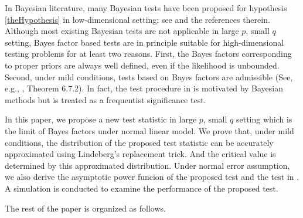 \documentclass[11pt]{article}
\theoremstyle{plain}
\theoremstyle{definition}
\theoremstyle{remark}
\begin{document}
In Bayesian literature, many Bayesian tests have been proposed for hypothesis \eqref{theHypothesis} in low-dimensional setting; see \cite{javier2006Obj,Goddard2016,zhou2018On} and the references therein.
Although most existing Bayesian tests are not applicable in large $p$, small $q$ setting,
Bayes factor based tests are in principle suitable for high-dimensional testing problems for at least two reasons.
First, the Bayes factors corresponding to proper priors are always well defined, even if the likelihood is unbounded.
Second, under mild conditions, tests based on Bayes factors are admissible (See, e.g., \cite{Lehmann}, Theorem 6.7.2).
In fact, the test procedure in \cite{Goeman2006} is motivated by Bayesian methods but is treated as a frequentist significance test.


In this paper, we propose a new test statistic in large $p$, small $q$ setting which is the limit of Bayes factors under normal linear model.
We prove that, under mild conditions, the distribution of the proposed test statistic can be accurately approximated using Lindeberg's replacement trick.
And the critical value is determined by this approximated distribution.
Under normal error assumption, we also derive the asymptotic power funcion of the proposed test and the test in \cite{Goeman2006}.
A simulation is conducted to examine the performance of the proposed test.

The rest of the paper is organized as follows.
\end{document}

